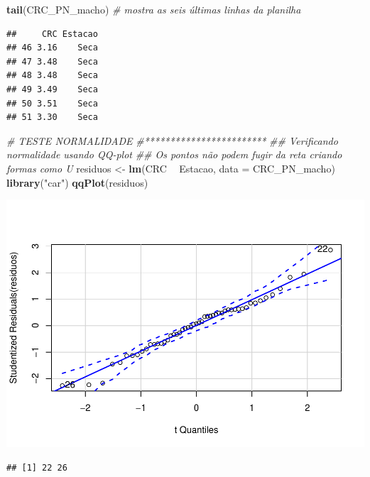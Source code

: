 \documentclass[
]{book}
\newenvironment{Shaded}{\begin{snugshade}}{\end{snugshade}}
\newcommand{\CommentTok}[1]{\textcolor[rgb]{0.56,0.35,0.01}{\textit{#1}}}
\newcommand{\DataTypeTok}[1]{\textcolor[rgb]{0.13,0.29,0.53}{#1}}
\newcommand{\KeywordTok}[1]{\textcolor[rgb]{0.13,0.29,0.53}{\textbf{#1}}}
\newcommand{\NormalTok}[1]{#1}
\newcommand{\OperatorTok}[1]{\textcolor[rgb]{0.81,0.36,0.00}{\textbf{#1}}}
\newcommand{\StringTok}[1]{\textcolor[rgb]{0.31,0.60,0.02}{#1}}
\begin{document}
\begin{Shaded}
\begin{Highlighting}[]
\KeywordTok{tail}\NormalTok{(CRC_PN_macho) }\CommentTok{# mostra as seis últimas linhas da planilha}
\end{Highlighting}
\end{Shaded}

\begin{verbatim}
##     CRC Estacao
## 46 3.16    Seca
## 47 3.48    Seca
## 48 3.48    Seca
## 49 3.49    Seca
## 50 3.51    Seca
## 51 3.30    Seca
\end{verbatim}

\begin{Shaded}
\begin{Highlighting}[]
\CommentTok{# TESTE NORMALIDADE}
\CommentTok{#************************}
\CommentTok{## Verificando normalidade usando QQ-plot}
\CommentTok{## Os pontos não podem fugir da reta criando formas como U}
\NormalTok{residuos <-}\StringTok{ }\KeywordTok{lm}\NormalTok{(CRC }\OperatorTok{~}\StringTok{ }\NormalTok{Estacao, }\DataTypeTok{data =}\NormalTok{ CRC_PN_macho)}
\KeywordTok{library}\NormalTok{(}\StringTok{"car"}\NormalTok{)}
\KeywordTok{qqPlot}\NormalTok{(residuos)}
\end{Highlighting}
\end{Shaded}

\includegraphics{livro_r_ecologia_files/figure-latex/unnamed-chunk-1-1.pdf}

\begin{verbatim}
## [1] 22 26
\end{verbatim}

\begin{Shaded}
\end{Shaded}
\end{document}
